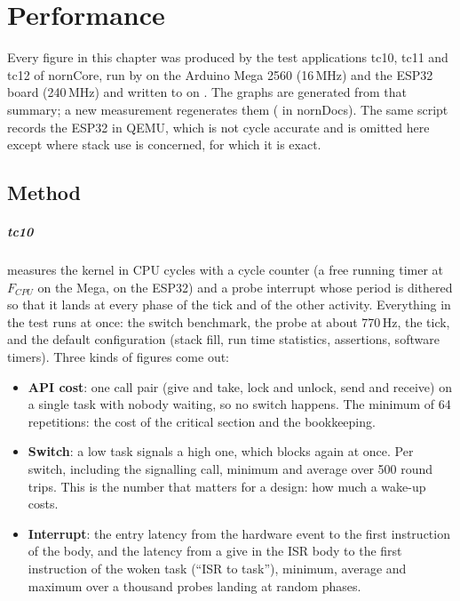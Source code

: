\chapter{Performance}
\label{ch:perf}

Every figure in this chapter was produced by the test applications tc10, tc11 and tc12
of nornCore, run by  on the Arduino Mega 2560 (16\,MHz) and the
ESP32 board (240\,MHz) and written to  on
\measDate. The graphs are generated from that summary; a new measurement regenerates
them ( in nornDocs). The same script records the ESP32 in QEMU, which is
not cycle accurate and is omitted here except where stack use is concerned, for which it
is exact.

\section{Method}

\paragraph{tc10} measures the kernel in CPU cycles with a cycle counter (a free running
timer at $F_{CPU}$ on the Mega,  on the ESP32) and a probe interrupt whose
period is dithered so that it lands at every phase of the tick and of the other
activity. Everything in the test runs at once: the switch benchmark, the probe at about
770\,Hz, the tick, and the default configuration (stack fill, run time statistics,
assertions, software timers). Three kinds of figures come out:

\begin{itemize}
\item \textbf{API cost}: one call pair (give and take, lock and unlock, send and
  receive) on a single task with nobody waiting, so no switch happens. The minimum of
  64 repetitions: the cost of the critical section and the bookkeeping.
\item \textbf{Switch}: a low task signals a high one, which blocks again at once. Per
  switch, including the signalling call, minimum and average over 500 round trips. This
  is the number that matters for a design: how much a wake-up costs.
\item \textbf{Interrupt}: the entry latency from the hardware event to the first
  instruction of the  body, and the latency from a give in the ISR body
  to the first instruction of the woken task (``ISR to task''), minimum, average and
  maximum over a thousand probes landing at random phases.
\end{itemize}

